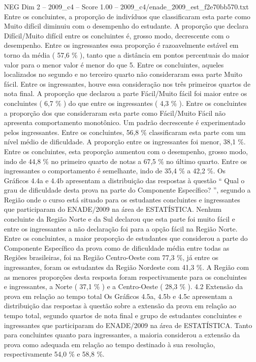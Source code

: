 \begin{textsample}{NEG Dim 2 – 2009\_c4 – Score 1.00 – 2009\_c4/enade\_2009\_est\_f2e70bb570.txt}
Entre os concluintes, a proporção de indivíduos que classificaram esta parte como Muito difícil diminuiu com o desempenho do estudante.
A proporção que declara Difícil/Muito difícil entre os concluintes é, grosso modo, decrescente com o desempenho.
Entre os ingressantes essa proporção é razoavelmente estável em torno da média ( 57,6 \% ), tanto que a distância em pontos percentuais do maior valor para o menor valor é menor do que 5.
Entre os concluintes, aqueles localizados no segundo e no terceiro quarto não consideraram essa parte Muito fácil.
Entre os ingressantes, houve essa consideração nos três primeiros quartos de nota final.
A proporção que declarou a parte Fácil/Muito fácil foi maior entre os concluintes ( 6,7 \% ) do que entre os ingressantes ( 4,3 \% ).
Entre os concluintes a proporção dos que consideraram esta parte como Fácil/Muito Fácil não apresenta comportamento monotônico.
Um padrão decrescente é experimentado pelos ingressantes.
Entre os concluintes, 56,8 \% classificaram esta parte com um nível médio de dificuldade.
A proporção entre os ingressantes foi menor, 38,1 \%.
Entre os concluintes, esta proporção aumentou com o desempenho, grosso modo, indo de 44,8 \% no primeiro quarto de notas a 67,5 \% no último quarto.
Entre os ingressantes o comportamento é semelhante, indo de 35,4 \% a 42,2 \%.
Os Gráficos 4.4a e 4.4b apresentam a distribuição das respostas à questão “ Qual o grau de dificuldade desta prova na parte do Componente Específico? ”, segundo a Região onde o curso está situado para os estudantes concluintes e ingressantes que participaram do ENADE/2009 na área de ESTATÍSTICA.
Nenhum concluinte da Região Norte e da Sul declarou que esta parte foi muito fácil e entre os ingressantes a não declaração foi para a opção fácil na Região Norte.
Entre os concluintes, a maior proporção de estudantes que considerou a parte do Componente Específico da prova como de dificuldade média entre todas as Regiões brasileiras, foi na Região Centro-Oeste com 77,3 \%, já entre os ingressantes, foram os estudantes da Região Nordeste com 41,3 \%.
A Região com as menores proporções desta resposta foram respectivamente para os concluintes e ingressantes, a Norte ( 37,1 \% ) e a Centro-Oeste ( 28,3 \% ). 4.2 Extensão da prova em relação ao tempo total Os Gráficos 4.5a, 4.5b e 4.5c apresentam a distribuição das respostas à questão sobre a extensão da prova em relação ao tempo total, segundo quartos de nota final e grupo de estudantes concluintes e ingressantes que participaram do ENADE/2009 na área de ESTATÍSTICA.
Tanto para concluintes quanto para ingressantes, a maioria considerou a extensão da prova como adequada em relação ao tempo destinado à sua resolução, respectivamente 54,0 \% e 58,8 \%.

\end{textsample}
